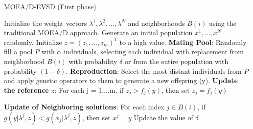 \begin{algorithm}[!t]
\caption{MOEA/D-EVSD (First phase)}
\label{alg:MOEAD_DVS}
\begin{scriptsize}
\begin{algorithmic}[1]
        \STATE Initialize the weight vectors $\lambda^1, \lambda^2, ..., \lambda^N$ and neighborhoods $B(i)$ using the traditional MOEA/D approach.
    \STATE Generate an initial population $x^1, ..., x^N$ randomly.
    \STATE Initialize $z = (z_1, ..., z_m)^T$ to a high value.
    \STATE \textbf{Mating Pool}:  Randomly fill a pool $P$ with $\alpha$ individuals, selecting each individual with replacement from neighborhood $B(i)$ with probability $\delta$ or from the entire population with probability $(1 - \delta)$.
    \STATE \textbf{Reproduction}: Select the most distant individuals from $P$ and apply genetic operators to them to generate a new offspring (y).
    \STATE \textbf{Update the reference $z$}: For each j = 1,..,m, if $z_j > f_j(y)$, then set $z_j = f_j(y)$

    \STATE \textbf{Update of Neighboring solutions}: For each index $j \in B(i)$, if $g(y| \lambda^j, z) < g(x_j| \lambda^j, z)$, then set $x^j = y$
    \ENDFOR
    \STATE Update the value of $\delta$
  \ENDWHILE
\end{algorithmic}
\end{scriptsize}
\end{algorithm}

